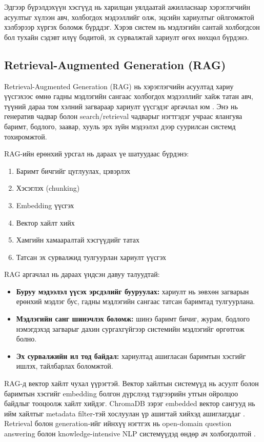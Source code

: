 Эдгээр бүрэлдэхүүн хэсгүүд нь харилцан уялдаатай ажилласнаар хэрэглэгчийн асуултыг хүлээн авч, холбогдох мэдээллийг олж, эцсийн хариултыг ойлгомжтой хэлбэрээр хүргэх боломж бүрддэг. Хэрэв систем нь мэдлэгийн сантай холбогдсон бол тухайн сэдэвт илүү бодитой, эх сурвалжтай хариулт өгөх нөхцөл бүрдэнэ.

\subsection{Retrieval-Augmented Generation (RAG)}

Retrieval-Augmented Generation (RAG) нь хэрэглэгчийн асуултад хариу үүсгэхээс өмнө гадны мэдлэгийн сангаас холбогдох мэдээллийг хайж татан авч, түүний дараа том хэлний загвараар хариулт үүсгэдэг аргачлал юм \cite{rag_survey}. Энэ нь генератив чадвар болон search/retrieval чадварыг нэгтгэдэг учраас ялангуяа баримт, бодлого, заавар, хууль эрх зүйн мэдээлэл дээр суурилсан системд тохиромжтой.

RAG-ийн ерөнхий урсгал нь дараах үе шатуудаас бүрдэнэ:
\begin{enumerate}
    \item Баримт бичгийг цуглуулах, цэвэрлэх
    \item Хэсэглэх (chunking)
    \item Embedding үүсгэх
    \item Вектор хайлт хийх
    \item Хамгийн хамааралтай хэсгүүдийг татах
    \item Татсан эх сурвалжид тулгуурлан хариулт үүсгэх
\end{enumerate}

RAG аргачлал нь дараах үндсэн давуу талуудтай:
\begin{itemize}
    \item \textbf{Буруу мэдээлэл үүсэх эрсдэлийг бууруулах:} хариулт нь зөвхөн загварын ерөнхий мэдлэг бус, гадны мэдлэгийн сангаас татсан баримтад тулгуурлана.
    \item \textbf{Мэдлэгийн санг шинэчлэх боломж:} шинэ баримт бичиг, журам, бодлого нэмэгдэхэд загварыг дахин сургахгүйгээр системийн мэдлэгийг өргөтгөж болно.
    \item \textbf{Эх сурвалжийн ил тод байдал:} хариултад ашигласан баримтын хэсгийг ишлэх, тайлбарлах боломжтой.
\end{itemize}

RAG-д вектор хайлт чухал үүрэгтэй. Вектор хайлтын системүүд нь асуулт болон баримтын хэсгийг embedding болгон дүрслээд тэдгээрийн утгын ойролцоо байдлыг тооцоолж хайлт хийдэг. ChromaDB зэрэг embedded вектор сангууд нь ийм хайлтыг metadata filter-тэй хослуулан үр ашигтай хийхэд ашиглагддаг \cite{chromadb}. Retrieval болон generation-ийг ийнхүү нэгтгэх нь open-domain question answering болон knowledge-intensive NLP системүүдэд өндөр ач холбогдолтой \cite{grounded_generation}.

